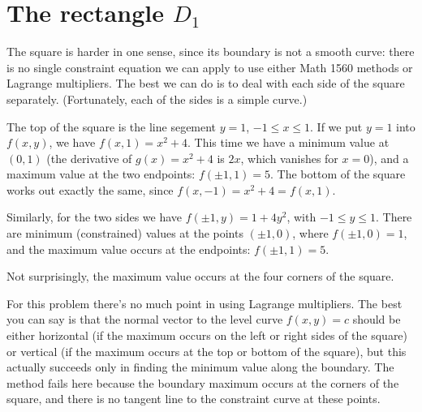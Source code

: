 \documentclass[12pt,letterpaper]{article}
\begin{document}
\section{The rectangle $D_1$}
The square is harder in one sense, since its boundary is not a smooth curve: there is no single constraint equation we can apply to use either Math 1560 methods or Lagrange multipliers. The best we can do is to deal with each side of the square separately. (Fortunately, each of the sides is a simple curve.)

\bigskip

The top of the square is the line segement $y=1$, $-1\leq x\leq 1$. If we put $y=1$ into $f(x,y)$, we have $f(x,1) = x^2+4$. This time we have a minimum value at $(0,1)$ (the derivative of $g(x)=x^2+4$ is $2x$, which vanishes for  $x=0$), and a maximum value at the two endpoints: $f(\pm 1, 1) = 5$. The bottom of the square works out exactly the same, since $f(x,-1) = x^2+4 = f(x,1)$.

Similarly, for the two sides we have $f(\pm 1, y) = 1+4y^2$, with $-1\leq y\leq 1$. There are minimum (constrained) values at the points $(\pm 1, 0)$, where $f(\pm 1,0)=1$, and the maximum value occurs at the endpoints: $f(\pm 1, 1)=5$.

Not surprisingly, the maximum value occurs at the four corners of the square.

\bigskip

For this problem there's no much point in using Lagrange multipliers. The best you can say is that the normal vector to the level curve $f(x,y)=c$ should be either horizontal (if the maximum occurs on the left or right sides of the square) or vertical (if the maximum occurs at the top or bottom of the square), but this actually succeeds only in finding the minimum value along the boundary. The method fails here because the boundary maximum occurs at the corners of the square, and there is no tangent line to the constraint curve at these points.
\end{document}
